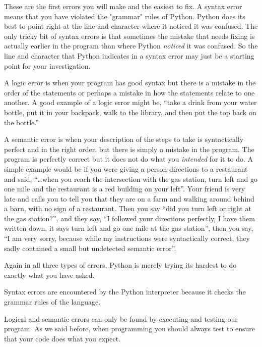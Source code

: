 \begin{description}
\tightlist
\item[Syntax errors]
These are the first errors you will make and the easiest to fix. A syntax error means that you have violated the "grammar" rules of Python. Python does its best to point right at the line and character where it noticed it was confused. The only tricky bit of syntax errors is that sometimes the mistake that needs fixing is actually earlier in the program than where Python \emph{noticed} it was confused. So the line and character that Python indicates in a syntax error may just be a starting point for your investigation.
\item[Logic errors]
A logic error is when your program has good syntax but there is a mistake in the order of the statements or perhaps a mistake in how the statements relate to one another. A good example of a logic error might be, ``take a drink from your water bottle, put it in your backpack, walk to the library, and then put the top back on the bottle.''
\item[Semantic errors]
A semantic error is when your description of the steps to take is syntactically perfect and in the right order, but there is simply a mistake in the program. The program is perfectly correct but it does not do what you \emph{intended} for it to do. A simple example would be if you were giving a person directions to a restaurant and said, ``\ldots when you reach the intersection with the gas station, turn left and go one mile and the restaurant is a red building on your left''. Your friend is very late and calls you to tell you that they are on a farm and walking around behind a barn, with no sign of a restaurant. Then you say ``did you turn left or right at the gas station?'', and they say, ``I followed your directions perfectly, I have them written down, it says turn left and go one mile at the gas station'', then you say, ``I am very sorry, because while my instructions were syntactically correct, they sadly contained a small but undetected semantic error''.
\end{description}

Again in all three types of errors, Python is merely trying its hardest to do exactly what you have asked.

Syntax errors are encountered by the Python interpreter because it
checks the grammar rules of the language.

Logical and semantic errors can only be found by executing and
testing our program. As we said before, when programming you should always test to ensure that your code does what you expect.

